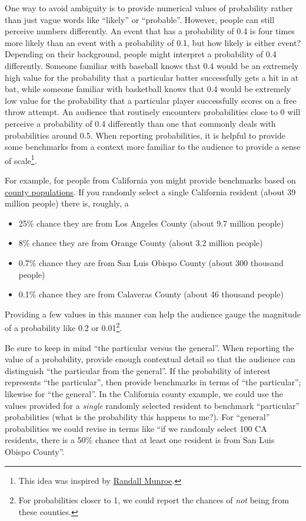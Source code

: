 \documentclass[
  letterpaper,
  DIV=11,
  numbers=noendperiod]{scrreprt}
\providecommand{\tightlist}{%
  \setlength{\itemsep}{0pt}\setlength{\parskip}{0pt}}
\theoremstyle{plain}
\theoremstyle{definition}
\theoremstyle{definition}
\theoremstyle{definition}
\theoremstyle{remark}
\begin{document}
One way to avoid ambiguity is to provide numerical values of probability
rather than just vague words like ``likely'' or ``probable''. However,
people can still perceive numbers differently. An event that has a
probability of 0.4 is four times more likely than an event with a
probability of 0.1, but how likely is either event? Depending on their
background, people might interpret a probability of 0.4 differently.
Someone familiar with baseball knows that 0.4 would be an extremely high
value for the probability that a particular batter successfully gets a
hit in at bat, while someone familiar with basketball knows that 0.4
would be extremely low value for the probability that a particular
player successfully scores on a free throw attempt. An audience that
routinely encounters probabilities close to 0 will perceive a
probability of 0.4 differently than one that commonly deals with
probabilities around 0.5. When reporting probabilities, it is helpful to
provide some benchmarks from a context more familiar to the audience to
provide a sense of scale\footnote{This idea was inspired by
  \href{https://fivethirtyeight.com/features/xkcd-randall-munroe-qanda-what-if/}{Randall
  Munroe}.}.

For example, for people from California you might provide benchmarks
based on
\href{https://en.wikipedia.org/wiki/List_of_counties_in_California}{county
populations}. If you randomly select a single California resident (about
39 million people) there is, roughly, a

\begin{itemize}
\tightlist
\item
  25\% chance they are from Los Angeles County (about 9.7 million
  people)
\item
  8\% chance they are from Orange County (about 3.2 million people)
\item
  0.7\% chance they are from San Luis Obispo County (about 300 thousand
  people)
\item
  0.1\% chance they are from Calaveras County (about 46 thousand people)
\end{itemize}

Providing a few values in this manner can help the audience gauge the
magnitude of a probability like 0.2 or 0.01\footnote{For probabilities
  closer to 1, we could report the chances of \emph{not} being from
  these counties.}.

Be sure to keep in mind ``the particular versus the general''. When
reporting the value of a probability, provide enough contextual detail
so that the audience can distinguish ``the particular from the
general''. If the probability of interest represents ``the particular'',
then provide benchmarks in terms of ``the particular''; likewise for
``the general''. In the California county example, we could use the
values provided for a \emph{single} randomly selected resident to
benchmark ``particular'' probabilities (what is the probability this
happens to me?). For ``general'' probabilities we could revise in terms
like ``if we randomly select 100 CA residents, there is a 50\% chance
that at least one resident is from San Luis Obispo County''.
\end{document}

